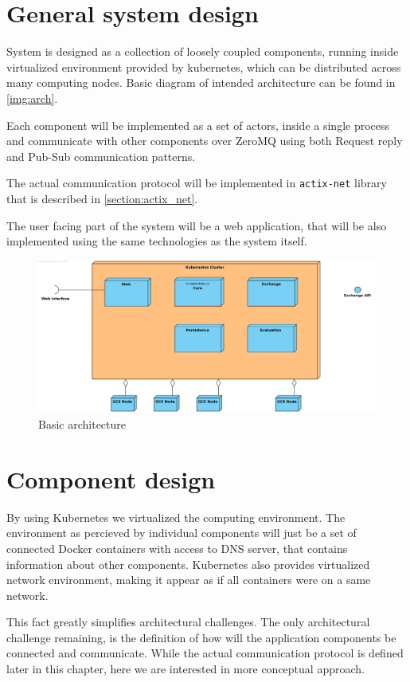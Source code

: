 \section{General system design}
System is designed as a collection of loosely coupled components, running inside virtualized environment provided by kubernetes, which
can be distributed across many computing nodes. Basic diagram of intended architecture can be found in \autoref{img:arch}.

Each component will be implemented as a set of actors, inside a single process and communicate with other components
over ZeroMQ using both Request reply and Pub-Sub communication patterns.

The actual communication protocol will be implemented in \verb|actix-net| library that is described in \autoref{section:actix_net}.

The user facing part of the system will be a web application, that will be also implemented using the same technologies
as the system itself.


\begin{figure}[H]
    \includegraphics[width=\textwidth]{obrazky-figures/Deployment Diagram1.png}
    \caption{Basic architecture}
    \label{img:arch}
\end{figure}


\section{Component design}
By using Kubernetes we virtualized the computing environment. The environment as percieved by individual components
will just be a set of connected Docker containers with access to DNS server, that contains information about other components.
Kubernetes also provides virtualized network environment, making it appear as if all containers were on a same network.

This fact greatly simplifies architectural challenges. The only architectural challenge remaining, is the definition
of how will the application components be connected and communicate. While the actual communication protocol is
defined later in this chapter, here we are interested in more conceptual approach.

